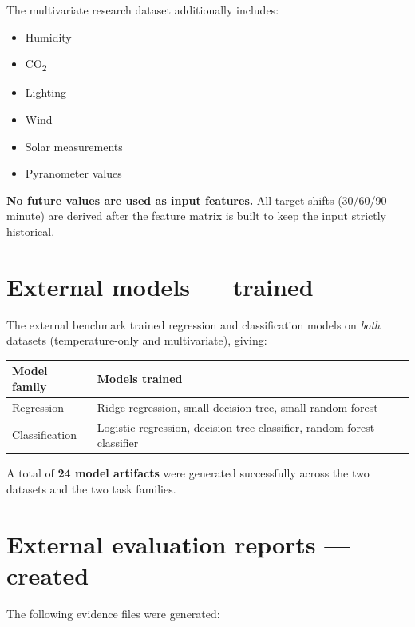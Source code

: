 \documentclass[11pt,a4paper]{article}
\begin{document}
\noindent The multivariate research dataset additionally includes:

\begin{itemize}[leftmargin=2em,itemsep=2pt]
  \item Humidity
  \item CO\textsubscript{2}
  \item Lighting
  \item Wind
  \item Solar measurements
  \item Pyranometer values
\end{itemize}

\noindent \textbf{No future values are used as input features.} All
target shifts (30/60/90-minute) are derived after the feature matrix is
built to keep the input strictly historical.

\section{External models --- trained}

The external benchmark trained regression and classification models on
\emph{both} datasets (temperature-only and multivariate), giving:

\begin{center}
\begin{tabularx}{0.9\textwidth}{L{6.5cm}L{7cm}}
\toprule
\textbf{Model family} & \textbf{Models trained} \\
\midrule
Regression     & Ridge regression, small decision tree, small random forest \\
Classification & Logistic regression, decision-tree classifier, random-forest classifier \\
\bottomrule
\end{tabularx}
\end{center}

\noindent A total of \textbf{24 model artifacts} were generated
successfully across the two datasets and the two task families.

\section{External evaluation reports --- created}

The following evidence files were generated:
\end{document}
